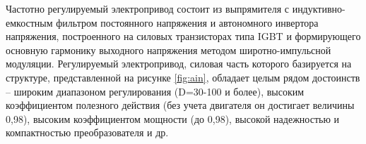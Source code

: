         Частотно регулируемый электропривод состоит из выпрямителя с
        индуктивно-емкостным фильтром постоянного напряжения и автономного
        инвертора напряжения, построенного на силовых транзисторах типа IGBT и
        формирующего основную гармонику выходного напряжения методом
        широтно-импульсной модуляции.  Регулируемый электропривод, силовая
        часть которого базируется на структуре, представленной на рисунке
        \ref{fig:ain}, обладает целым рядом достоинств -- широким диапазоном
        регулирования (D=30-100 и более), высоким коэффициентом полезного
        действия (без учета двигателя он достигает величины 0,98), высоким
        коэффициентом мощности (до 0,98), высокой надежностью и компактностью
        преобразователя и др. 

        \clearpage

